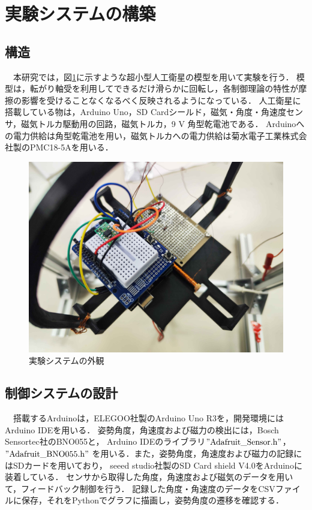 \section{実験システムの構築}
\subsection{構造}
　本研究では，図\ref{fig:system}に示すような超小型人工衛星の模型を用いて実験を行う．
模型は，転がり軸受を利用してできるだけ滑らかに回転し，各制御理論の特性が摩擦の影響を受けることなくなるべく反映されるようになっている．
人工衛星に搭載している物は，Arduino Uno，SD Cardシールド，磁気・角度・角速度センサ，磁気トルカ駆動用の回路，磁気トルカ，9 V 角型乾電池である．
Arduinoへの電力供給は角型乾電池を用い，磁気トルカへの電力供給は菊水電子工業株式会社製のPMC18-5Aを用いる．

\begin{figure}[H]
	\centering
		\includegraphics[scale=0.1]{./figure/実験システム.jpg}
		\caption{実験システムの外観}
		\label{fig:system}
\end{figure}

\subsection{制御システムの設計}

　搭載するArduinoは，ELEGOO社製のArduino Uno R3を，開発環境にはArduino IDEを用いる．
姿勢角度，角速度および磁力の検出には，Bosch Sensortec社のBNO055と，
Arduino IDEのライブラリ$"\mathrm{Adafruit\_Sensor.h}"$，$"\mathrm{Adafruit\_BNO055.h}"$
を用いる．また，姿勢角度，角速度および磁力の記録にはSDカードを用いており，
seeed studio社製のSD Card shield V4.0をArduinoに装着している．
センサから取得した角度，角速度および磁気のデータを用いて，フィードバック制御を行う．
記録した角度・角速度のデータをCSVファイルに保存，それをPythonでグラフに描画し，姿勢角度の遷移を確認する．

